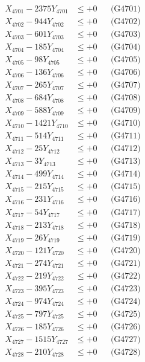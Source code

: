 \documentclass[a4paper,10pt]{article}
\begin{document}
{\begin{align}
\allowbreak
X_{4701} - 2375Y_{4701} &\leq +0 && \text{(G4701)} \\
X_{4702} - 944Y_{4702} &\leq +0 && \text{(G4702)} \\
X_{4703} - 601Y_{4703} &\leq +0 && \text{(G4703)} \\
X_{4704} - 185Y_{4704} &\leq +0 && \text{(G4704)} \\
X_{4705} - 98Y_{4705} &\leq +0 && \text{(G4705)} \\
X_{4706} - 136Y_{4706} &\leq +0 && \text{(G4706)} \\
X_{4707} - 265Y_{4707} &\leq +0 && \text{(G4707)} \\
X_{4708} - 684Y_{4708} &\leq +0 && \text{(G4708)} \\
X_{4709} - 588Y_{4709} &\leq +0 && \text{(G4709)} \\
X_{4710} - 1421Y_{4710} &\leq +0 && \text{(G4710)} \\
\allowbreak
X_{4711} - 514Y_{4711} &\leq +0 && \text{(G4711)} \\
X_{4712} - 25Y_{4712} &\leq +0 && \text{(G4712)} \\
X_{4713} - 3Y_{4713} &\leq +0 && \text{(G4713)} \\
X_{4714} - 499Y_{4714} &\leq +0 && \text{(G4714)} \\
X_{4715} - 215Y_{4715} &\leq +0 && \text{(G4715)} \\
X_{4716} - 231Y_{4716} &\leq +0 && \text{(G4716)} \\
X_{4717} - 54Y_{4717} &\leq +0 && \text{(G4717)} \\
X_{4718} - 213Y_{4718} &\leq +0 && \text{(G4718)} \\
X_{4719} - 26Y_{4719} &\leq +0 && \text{(G4719)} \\
X_{4720} - 121Y_{4720} &\leq +0 && \text{(G4720)} \\
\allowbreak
X_{4721} - 274Y_{4721} &\leq +0 && \text{(G4721)} \\
X_{4722} - 219Y_{4722} &\leq +0 && \text{(G4722)} \\
X_{4723} - 395Y_{4723} &\leq +0 && \text{(G4723)} \\
X_{4724} - 974Y_{4724} &\leq +0 && \text{(G4724)} \\
X_{4725} - 797Y_{4725} &\leq +0 && \text{(G4725)} \\
X_{4726} - 185Y_{4726} &\leq +0 && \text{(G4726)} \\
X_{4727} - 1515Y_{4727} &\leq +0 && \text{(G4727)} \\
X_{4728} - 210Y_{4728} &\leq +0 && \text{(G4728)} \\

\end{align}}
\end{document}
